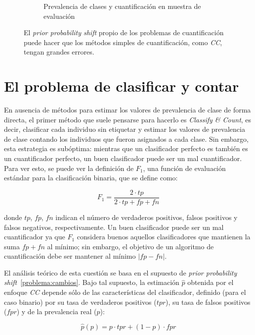 \begin{figure}[h]
\begin{subfigure}[t]{0.4\textwidth}
        \caption{Prevalencia de clases y cuantificación en muestra de
        evaluación}\label{cambios:cuantificacion_tst}
    \end{subfigure}
    \caption{El {\it prior probability shift\/} propio de los problemas de
    cuantificación puede hacer que los métodos simples de cuantificación, como
    {\it CC}, tengan grandes errores.}
\end{figure}

\section{El problema de clasificar y contar}

En ausencia de métodos para estimar los valores de prevalencia de clase de forma
directa, el primer método que suele pensarse para hacerlo es {\it Classify \&
Count}, es decir, clasificar cada individuo sin etiquetar y estimar los valores
de prevalencia de clase contando los individuos que fueron asignados a cada
clase. Sin embargo, esta estrategia es subóptima: mientras que un clasificador
perfecto es también es un cuantificador perfecto, un buen clasificador puede ser
un mal cuantificador. Para ver esto, se puede ver la definición de $F_1$, una
función de evaluación estándar para la clasificación binaria, que se define
como:

\begin{equation}
    F_1 = \frac{2 \cdot tp}{2 \cdot tp + fp + fn}
\end{equation}

donde $tp$, $fp$, $fn$ indican el número de verdaderos positivos, falsos
positivos y falsos negativos, respectivamente. Un buen clasificador puede ser un
mal cuantificador ya que $F_1$ considera buenos aquellos clasificadores que
mantienen la suma $fp + fn$ al mínimo; sin embargo, el objetivo de un algoritmo
de cuantificación debe ser mantener al mínimo $|fp-fn|$.

El análisis teórico de esta cuestión se basa en el supuesto de {\it prior
probability shift\/}~\ref{problema:cambios}. Bajo tal supuesto, la estimación
$\hat p$ obtenida por el enfoque {\it CC\/} depende sólo de las características
del clasificador, definido (para el caso binario) por su tasa de verdaderos
positivos ($tpr$), su tasa de falsos positivos ($fpr$) y de la prevalencia real
($p$):

\begin{equation}\label{ecuacion:cc}
    \hat p(p) = p \cdot {tpr} + (1-p) \cdot {fpr}
\end{equation}

